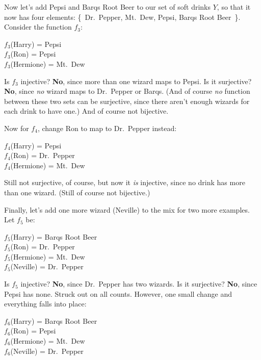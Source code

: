 Now let's add Pepsi and Barqs Root Beer to our set
of soft drinks $Y$, so that it now has four elements: \{~Dr.~Pepper,
Mt.~Dew, Pepsi, Barqs Root Beer~\}. Consider the function $f_3$:

\begin{center}
$f_3$(Harry) = Pepsi \\
$f_3$(Ron) = Pepsi \\
$f_3$(Hermione) = Mt.~Dew
\end{center}

Is $f_3$ injective? \textbf{No}, since more than one wizard maps to
Pepsi. Is it surjective? \textbf{No}, since \textit{no} wizard maps to
Dr.~Pepper or Barqs. (And of course \textit{no} function between these two
sets can be surjective, since there aren't enough wizards for each drink to
have one.) And of course not bijective.

Now for $f_4$, change Ron to map to Dr.~Pepper instead:

\begin{center}
$f_4$(Harry) = Pepsi \\
$f_4$(Ron) = Dr.~Pepper \\
$f_4$(Hermione) = Mt.~Dew
\end{center}

Still not surjective, of course, but now it \textit{is} injective, since
no drink has more than one wizard. (Still of course not bijective.)

Finally, let's add one more wizard (Neville) to the mix for two more
examples. Let $f_5$ be:

\begin{center}
$f_5$(Harry) = Barqs Root Beer \\
$f_5$(Ron) = Dr.~Pepper \\
$f_5$(Hermione) = Mt.~Dew \\
$f_5$(Neville) = Dr.~Pepper
\end{center}

Is $f_5$ injective? \textbf{No}, since Dr.~Pepper has two wizards. Is it
surjective? \textbf{No}, since Pepsi has none. Struck out on all counts.
However, one small change and everything falls into place:

\begin{center}
$f_6$(Harry) = Barqs Root Beer \\
$f_6$(Ron) = Pepsi \\
$f_6$(Hermione) = Mt.~Dew \\
$f_6$(Neville) = Dr.~Pepper
\end{center}

